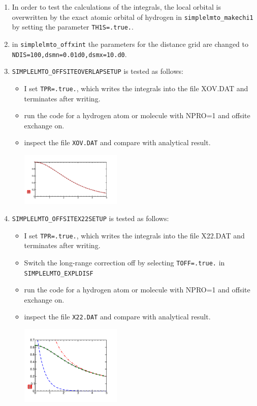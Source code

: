 \documentclass[11pt,a4paper]{report}
\begin{document}
\begin{enumerate}
\item In order to test the calculations of the integrals, the local
  orbital is overwritten by the exact atomic orbital of hydrogen in
  \verb|simplelmto_makechi1| by setting the parameter
  \verb|TH1S=.true.|.
%
\item in \verb|simplelmto_offxint| the parameters for the distance
  grid are changed to \verb|NDIS=100,dsmn=0.01d0,dsmx=10.d0|.
%
\item \verb|SIMPLELMTO_OFFSITEOVERLAPSETUP| is tested as follows:
    \begin{itemize}
    \item I set \verb|TPR=.true.|, which writes the integrals into the
      file XOV.DAT and terminates after writing.
    \item run the code for a hydrogen atom or molecule with NPRO=1 and
      offsite exchange on.
    \item inspect the file \verb|XOV.DAT| and compare with analytical
      result. 
\begin{center}
\includegraphics[width=0.4\textwidth]{Figs/Dihydrogenion/xovofr}
\end{center}
    \end{itemize}
%
\item \verb|SIMPLELMTO_OFFSITEX22SETUP| is tested as follows:
  \begin{itemize}
    \item I set \verb|TPR=.true.|, which writes the integrals into the
      file X22.DAT and terminates after writing.
    \item Switch the long-range correction off by selecting
      \verb|TOFF=.true.| in \verb|SIMPLELMTO_EXPLDISF|
    \item run the code for a hydrogen atom or molecule with NPRO=1 and
      offsite exchange on.
    \item inspect the file \verb|X22.DAT| and compare with analytical
      result. 
\begin{center}
\includegraphics[width=0.4\textwidth]{Figs/Dihydrogenion/x22ofr}

\end{center}
\end{itemize}
\end{enumerate}
\end{document}
